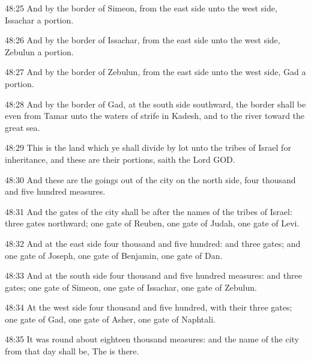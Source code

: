 48:25 And by the border of Simeon, from the east side unto the west
side, Issachar a portion.

48:26 And by the border of Issachar, from the east side unto the west
side, Zebulun a portion.

48:27 And by the border of Zebulun, from the east side unto the west
side, Gad a portion.

48:28 And by the border of Gad, at the south side southward, the
border shall be even from Tamar unto the waters of strife in Kadesh,
and to the river toward the great sea.

48:29 This is the land which ye shall divide by lot unto the tribes of
Israel for inheritance, and these are their portions, saith the Lord
GOD.

48:30 And these are the goings out of the city on the north side, four
thousand and five hundred measures.

48:31 And the gates of the city shall be after the names of the tribes
of Israel: three gates northward; one gate of Reuben, one gate of
Judah, one gate of Levi.

48:32 And at the east side four thousand and five hundred: and three
gates; and one gate of Joseph, one gate of Benjamin, one gate of Dan.

48:33 And at the south side four thousand and five hundred measures:
and three gates; one gate of Simeon, one gate of Issachar, one gate of
Zebulun.

48:34 At the west side four thousand and five hundred, with their
three gates; one gate of Gad, one gate of Asher, one gate of Naphtali.

48:35 It was round about eighteen thousand measures: and the name of
the city from that day shall be, The \LORD is there.

